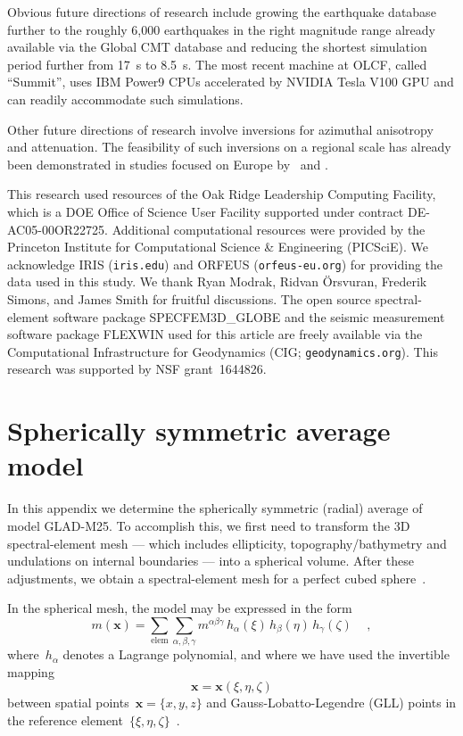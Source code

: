\documentclass[extra,mreferee]{gji}
\begin{document}
Obvious future directions of research include growing the earthquake database further to the roughly 6,000 earthquakes in the right magnitude range already available via the Global CMT database
and reducing the shortest simulation period further from 17~s to 8.5~s.
The most recent machine at OLCF, called ``Summit'', uses IBM Power9 CPUs accelerated by NVIDIA Tesla V100 GPU and can readily accommodate such simulations.

Other future directions of research involve inversions for azimuthal anisotropy
and attenuation.
The feasibility of such inversions on a regional scale has already been demonstrated in studies focused on Europe by~\cite{ZhuTromp2013} and \cite{Zhuetal2013}.

\begin{acknowledgments}
This research used resources of the Oak Ridge Leadership Computing Facility,
which is a DOE Office of Science User Facility supported under contract DE-AC05-00OR22725.
Additional computational resources were provided by the Princeton Institute
for Computational Science \& Engineering (PICSciE).
We acknowledge IRIS ({\tt iris.edu}) and ORFEUS ({\tt orfeus-eu.org}) for
providing the data used in this study.
We thank Ryan Modrak, Ridvan \"{O}rsvuran, Frederik Simons, and James Smith for fruitful discussions.
The open source spectral-element software package SPECFEM3D\_GLOBE and
the seismic measurement software package FLEXWIN used for this article are
 freely available via the Computational Infrastructure for Geodynamics
 (CIG; {\tt geodynamics.org}). This research was supported by NSF grant~1644826.

\end{acknowledgments}

\newpage

\appendix

\section{Spherically symmetric average model}
\label{sec:1Dmodel}

In this appendix we determine the spherically symmetric (radial) average of model GLAD-M25.
To accomplish this,
we first need to transform the 3D spectral-element mesh --- which includes ellipticity, topography/bathymetry and undulations on internal boundaries --- into a spherical volume.
After these adjustments, we obtain a spectral-element mesh for a perfect cubed sphere~\citep{KoTr02a}.

In the spherical mesh, the model may be expressed in the form
\begin{equation}
    m(\mathbf{x})=\sum_{\mathrm{elem}}\sum_{\alpha,\beta,\gamma}m^{\alpha\beta\gamma}\,h_{\alpha}(\xi)\,h_{\beta}(\eta)\,h_{\gamma}(\zeta)\,
    \quad ,
\end{equation}
where~$h_\alpha$ denotes a Lagrange polynomial, and where we have used the invertible mapping
\begin{equation}
    \mathbf{x}=\mathbf{x}(\xi,\eta,\zeta)
\end{equation}
between spatial points~$\mathbf{x}=\{x,y,z\}$ and Gauss-Lobatto-Legendre (GLL) points in the reference element~$\{\xi,\eta,\zeta\}$~\citep{KoTr99}.
\end{document}
